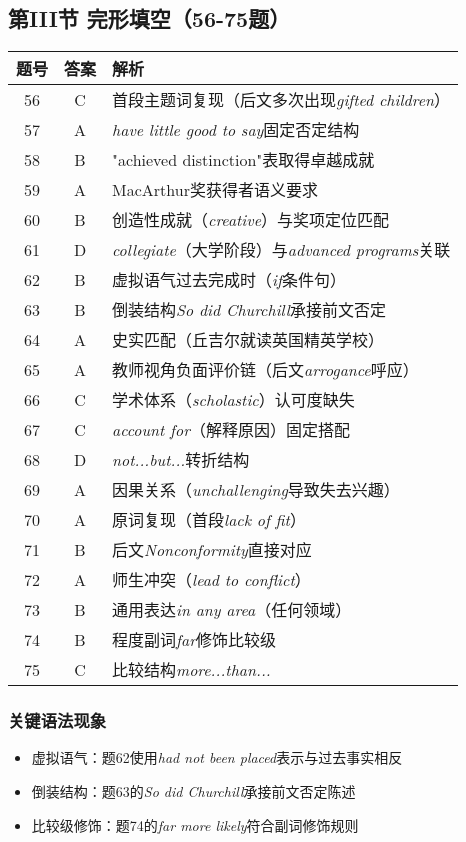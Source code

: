 \documentclass{article}
\begin{document}
\subsection*{第III节 完形填空（56-75题）}
\begin{tabular}{|c|c|l|}
\hline
题号 & 答案 & 解析 \\
\hline
56 & C & 首段主题词复现（后文多次出现\textit{gifted children}） \\
57 & A & \textit{have little good to say}固定否定结构 \\
58 & B & "achieved distinction"表取得卓越成就 \\
59 & A & MacArthur奖获得者语义要求 \\
60 & B & 创造性成就（\textit{creative}）与奖项定位匹配 \\
61 & D & \textit{collegiate}（大学阶段）与\textit{advanced programs}关联 \\
62 & B & 虚拟语气过去完成时（\textit{if}条件句） \\
63 & B & 倒装结构\textit{So did Churchill}承接前文否定 \\
64 & A & 史实匹配（丘吉尔就读英国精英学校） \\
65 & A & 教师视角负面评价链（后文\textit{arrogance}呼应） \\
66 & C & 学术体系（\textit{scholastic}）认可度缺失 \\
67 & C & \textit{account for}（解释原因）固定搭配 \\
68 & D & \textit{not...but...}转折结构 \\
69 & A & 因果关系（\textit{unchallenging}导致失去兴趣） \\
70 & A & 原词复现（首段\textit{lack of fit}） \\
71 & B & 后文\textit{Nonconformity}直接对应 \\
72 & A & 师生冲突（\textit{lead to conflict}） \\
73 & B & 通用表达\textit{in any area}（任何领域） \\
74 & B & 程度副词\textit{far}修饰比较级 \\
75 & C & 比较结构\textit{more...than...} \\
\hline
\end{tabular}

\subsubsection*{关键语法现象}
\begin{itemize}
    \item 虚拟语气：题62使用\textit{had not been placed}表示与过去事实相反
    \item 倒装结构：题63的\textit{So did Churchill}承接前文否定陈述
    \item 比较级修饰：题74的\textit{far more likely}符合副词修饰规则
\end{itemize}
\end{document}
